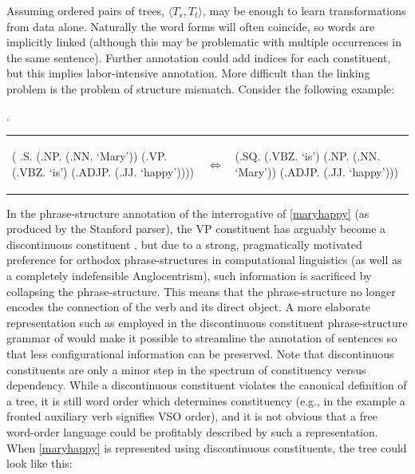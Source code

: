 \documentclass[a4paper]{article}
\theoremstyle{definition}
\begin{document}
Assuming ordered pairs of trees, $\langle T_{\mathit{s}},
T_{\mathit{t}} \rangle $, may be enough to learn transformations
from data alone. Naturally the word forms will often coincide, so words are
implicitly linked (although this may be problematic with multiple occurrences
in the same sentence). Further annotation could add indices for each
constituent, but this implies labor-intensive annotation. More difficult than
the linking problem is the problem of structure mismatch. Consider the following
example:

\ex. \label{maryhappy}

\begin{tabular}{lll}
\begin{parsetree}
   ( .S.
    (.NP. (.NN. `Mary'))
    (.VP. (.VBZ. `is')
      (.ADJP. (.JJ. `happy'))))
\end{parsetree}
& $\iff$ &
\begin{parsetree}
  (.SQ. 
    (.VBZ. `is')
    (.NP. (.NN. `Mary'))
    (.ADJP. (.JJ. `happy')))
\end{parsetree}
\end{tabular}
\vspace{1em}

In the phrase-structure annotation of the interrogative of \ref{maryhappy} (as produced
by the Stanford parser), the \textsc{VP} constituent has arguably become a
discontinuous constituent \citep{harman1963generative}, but due to a strong,
pragmatically motivated preference for orthodox phrase-structures in
computational linguistics (as well as a completely indefensible Anglocentrism),
such information is sacrificed by collapsing the phrase-structure. This means
that the phrase-structure no longer encodes the connection of the verb and its
direct object. A more elaborate representation such as employed in the
discontinuous constituent phrase-structure grammar of
\citet{harman1963generative} would make it possible to streamline the
annotation of sentences so that less configurational information can be
preserved.  Note that discontinuous constituents are only a minor step in the
spectrum of constituency versus dependency. While a discontinuous constituent
violates the canonical definition of a tree, it is still word order which
determines constituency (e.g., in the example a fronted auxiliary verb
signifies VSO order), and it is not obvious that a free word-order language
could be profitably described by such a representation.  When \ref{maryhappy}
is represented using discontinuous constituents, the tree could look like this:
\end{document}
